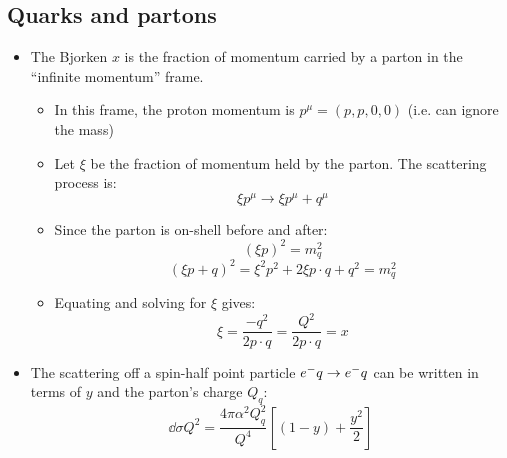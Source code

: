 \subsection{Quarks and partons}
\begin{itemize}
  \item The Bjorken $x$ is the fraction of momentum carried by a parton in the ``infinite momentum'' frame.
  \begin{itemize}
    \item In this frame, the proton momentum is $p^\mu = (p,p,0,0)$ (i.e. can ignore the mass)
    \item Let $\xi$ be the fraction of momentum held by the parton. The scattering process is:
    \begin{equation}
      \xi p^\mu \rightarrow \xi p^\mu + q^\mu
    \end{equation}
    \item Since the parton is on-shell before and after:
    \begin{equation}
      (\xi p)^2 =  m_q^2
    \end{equation}
    \begin{equation}
      (\xi p + q)^2 = \xi^2 p^2 + 2\xi p\cdot q + q^2 = m_q^2
    \end{equation}
    \item Equating and solving for $\xi$ gives:
    \begin{equation}
      \xi = \frac{-q^2}{2p\cdot q} = \frac{Q^2}{2p\cdot q} = x
    \end{equation}
  \end{itemize}
  \item The scattering off a spin-half point particle $e^{-} q \rightarrow e^{-} q$ can be written in terms of $y$ and the parton's charge $Q_q$:
  \begin{equation}
    \dd\sigma{Q^2} = \frac{4\pi\alpha^2Q_q^2}{Q^4} \left[(1-y) + \frac{y^2}{2}\right]
  \end{equation}
\end{itemize}


